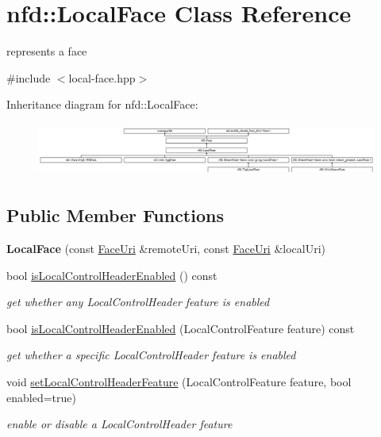 \hypertarget{classnfd_1_1LocalFace}{}\section{nfd\+:\+:Local\+Face Class Reference}
\label{classnfd_1_1LocalFace}


represents a face  




{\ttfamily \#include $<$local-\/face.\+hpp$>$}

Inheritance diagram for nfd\+:\+:Local\+Face\+:\begin{figure}[H]
\begin{center}
\leavevmode
\includegraphics[height=1.781170cm]{classnfd_1_1LocalFace}
\end{center}
\end{figure}
\subsection*{Public Member Functions}
\begin{DoxyCompactItemize}
\item 
{\bfseries Local\+Face} (const \hyperlink{classndn_1_1util_1_1FaceUri}{Face\+Uri} \&remote\+Uri, const \hyperlink{classndn_1_1util_1_1FaceUri}{Face\+Uri} \&local\+Uri)\hypertarget{classnfd_1_1LocalFace_a21392666568e16af5bed95ac8e7fb468}{}\label{classnfd_1_1LocalFace_a21392666568e16af5bed95ac8e7fb468}

\item 
bool \hyperlink{classnfd_1_1LocalFace_afb12007ecb1d5f706a8cd40243a53321}{is\+Local\+Control\+Header\+Enabled} () const
\begin{DoxyCompactList}\small\item\em get whether any Local\+Control\+Header feature is enabled \end{DoxyCompactList}\item 
bool \hyperlink{classnfd_1_1LocalFace_aa361b85cb9aaf3d4756bd92476b6939c}{is\+Local\+Control\+Header\+Enabled} (Local\+Control\+Feature feature) const
\begin{DoxyCompactList}\small\item\em get whether a specific Local\+Control\+Header feature is enabled \end{DoxyCompactList}\item 
void \hyperlink{classnfd_1_1LocalFace_a56354219a3e4ab919a884f5d9b65d009}{set\+Local\+Control\+Header\+Feature} (Local\+Control\+Feature feature, bool enabled=true)
\begin{DoxyCompactList}\small\item\em enable or disable a Local\+Control\+Header feature \end{DoxyCompactList}\end{DoxyCompactItemize}

